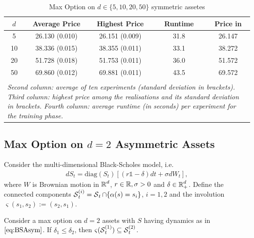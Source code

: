 \begin{table}[ht]
\caption{Max Option on $d \in\{5,10,20,50\}$ symmetric assetes}

\vspace{-2mm}
\label{tab:symMaxOpt}
  \centering
  \begin{tabular}{ c c c c c }
 \hline  \hline
   $d$ & Average Price& Highest Price & Runtime& Price in \cite{Becker2}\\
  \hline \hline
  5   & 26.130 (0.010)  & 26.151 (0.009) & 31.8  & 26.147 \\
  10   & 38.336 (0.015) &   38.355 (0.011)& 33.1 & 38.272 \\
    20   & 51.728 (0.018) & 51.753 (0.011)  & 36.0 & 51.572    \\
  50  & 69.860 (0.012) & 69.881 (0.011) & 43.5 & 69.572     \\
 \hline\\[-1em]
 
 \multicolumn{5}{l}{%
  \begin{minipage}{10.5cm}%
    \tiny \textit{Second  column:  average  of ten experiments (standard deviation in brackets). Third column: highest price  among the realisations and its standard deviation in brackets.  Fourth column:  average runtime (in seconds) per experiment for the training phase.}%
  \end{minipage}%
}
\end{tabular}

  \end{table}
  
\subsection{Max Option on $d=2$ Asymmetric Assets}\label{sec:maxCallAsym}
Consider the multi-dimensional Black-Scholes model, i.e. 
\begin{align}\label{eq:BSAsym}
    d S_t = \text{diag}(S_t) \left[ (r\mathds{1} - \delta)dt + \sigma dW_t\right],
\end{align}
where $W$ is Brownian motion in $\operatorname{\mathbb{R}}^d$, $r \in \operatorname{\mathbb{R}} ,\sigma > 0$ and $\delta \in \operatorname{\mathbb{R}}_+^d$. 
Define the connected components $\operatorname{\mathcal{S}}^{(i)}_t = \operatorname{\mathcal{S}}_t \cap \{\alpha(s) = s_i\}$, $i=1,2$ and the involution   $\varsigma(s_1,s_2) := (s_2,s_1)$.  

\begin{proposition} Consider a max option on $d=2$ assets with $S$ having dynamics as in $\eqref{eq:BSAsym}$. If $\delta_1 \le \delta_2$, then $\varsigma(\operatorname{\mathcal{S}}^{(1)}_t) \subseteq \operatorname{\mathcal{S}}^{(2)}_t$. 
\end{proposition}

